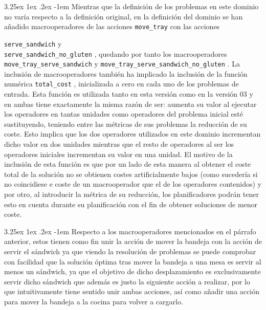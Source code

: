 \documentclass{article}
\makeatletter
\newcommand{\cool}[1] {
        {\texttt{#1}}
    }
\renewcommand\paragraph{\@startsection{paragraph}{5}{\z@}%
      {3.25ex \@plus1ex \@minus.2ex}%
      {-1em}%
      {\normalfont\normalsize\bfseries}}
\makeatother
\begin{document}
    \paragraph{}
    Mientras que la definición de los problemas en este dominio no varía
    respecto a la definición original, en la definición del dominio se han añadido 
    macrooperadores de las acciones \cool{move\_tray} con las acciones
    \cool{serve\_sandwich} y \\
    \cool{serve\_sandwich\_no\_gluten}, quedando por tanto los macrooperadores \\
    \cool{move\_tray\_serve\_sandwich} y \cool{move\_tray\_serve\_sandwich\_no\_gluten}. La inclusión de macrooperadores también ha implicado la inclusión de la función numérica \cool{total\_cost}, inicializada a cero en cada uno de los problemas de entrada. Esta función es utilizada tanto en esta versión como en la versión 03 y en ambas tiene exactamente la misma razón de ser: aumenta su valor al ejecutar los operadores en tantas unidades como operadores del problema inicial esté sustituyendo, teniendo entre las métricas de sus problemas la reducción de su coste. Esto implica que los dos operadores utilizados en este dominio incrementan dicho valor en dos unidades mientras que  el resto de operadores al ser los operadores iniciales incrementan su valor en una unidad. El motivo de la inclusión de esta función es que por un lado de esta manera al obtener el coste total de la solución no se obtienen costes artificialmente bajos (como sucedería si no coincidiese e coste de un macrooperador que el de los operadores contenidos) y por otro, al introducir la métrica de su reducción, los planificadores podrán tener esto en cuenta durante su planificación con el fin de obtener soluciones de menor coste.
    
    \paragraph{}
    Respecto a los macrooperadores mencionados en el párrafo anterior, estos tienen como fin unir la acción de mover la bandeja con la acción de
    servir el sándwich ya que viendo la resolución de problemas se puede comprobar
    con facilidad que la solución óptima tras mover la bandeja a una mesa es servir
    al menos un sándwich, ya que el objetivo de dicho desplazamiento es
    exclusivamente servir dicho sándwich que además es justo la siguiente acción a realizar,
    por lo que intuitivamente tiene sentido unir ambas acciones, así como añadir
    una acción para mover la bandeja a la cocina para volver a cargarlo.
    
\end{document}
